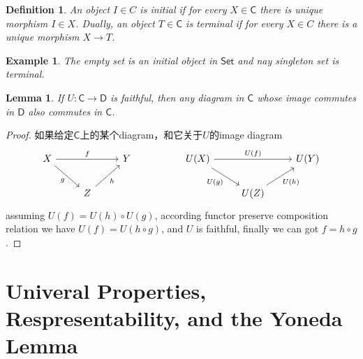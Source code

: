 \documentclass{article}
\newtheorem{lemma}[theorem]{Lemma}
\newtheorem{example}[theorem]{Example}
\newtheorem{definition}[theorem]{Definition}
\newcommand*{\cat}[1]{\textsf{#1}\xspace}
\newcommand{\Set}{\textsf{Set}\xspace}
\begin{document}
\begin{definition}
\rm An object $I \in C$ is initial if for every $X \in \cat{C}$ there is unique morphism $I \in X$. Dually, an object $T \in \cat{C}$ is terminal if for every $X \in C$ there is a unique morphism $X \to T$.  
\end{definition}

\begin{example}
\rm The empty set is an initial object in $\Set$ and nay singleton set is terminal. 
\end{example}

\begin{lemma}
\rm If $U:\cat{C} \to \cat{D}$ is faithful, then any diagram in $\cat{C}$ whose image commutes in $\cat{D}$ also commutes in $\cat{C}$.
\end{lemma}

\begin{proof}
如果给定$\cat{C}$上的某个diagram，和它关于$U$的image diagram
$$
\begin{tikzcd}
X \arrow[rr, "f"] \arrow[rd, "g"'] &                    & Y &  & U(X) \arrow[rr, "U(f)"] \arrow[rd, "U(g)"'] &                          & U(Y) \\
                                   & Z \arrow[ru, "h"'] &   &  &                                             & U(Z) \arrow[ru, "U(h)"'] &     
\end{tikzcd}
$$
assuming $U(f) = U(h) \circ U(g)$, according functor preserve composition relation we have $U(f) = U(h \circ g)$, and $U$ is faithful, finally we can got $f = h \circ g$. 
\end{proof}

\newpage
\section{Univeral Properties, Respresentability, and the Yoneda Lemma}
\end{document}

